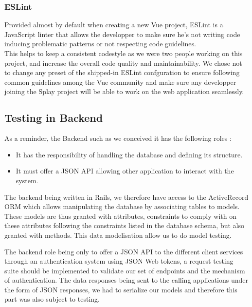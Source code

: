 \documentclass{eplmastersthesis}
\begin{document}
        \subsubsection{ESLint}

          Provided almost by default when creating a new Vue project, ESLint
          \cite{eslint} is a JavaScript linter that allows the developper to
          make sure he's not writing code inducing problematic patterns or not
          respecting code guidelines.\\
          This helps to keep a consistent codestyle as we were two people working
          on this project, and increase the overall code quality and
          maintainability. We chose not to change any preset of the shipped-in
          ESLint confguration to ensure following common guidelines among the Vue
          community and make sure any developper joining the Splay project will
          be able to work on the web application seamlessly.

      \subsection{Testing in Backend}

        As a reminder, the Backend such as we conceived it has the following
        roles :

        \begin{itemize}
          \item It has the responsibility of handling the database and
          defining its structure.
          \item It must offer a JSON API allowing other application to interact
          with the system.
        \end{itemize}

        The backend being written in Rails, we therefore have access to the
        ActiveRecord ORM which allows manipulating the database by associating
        tables to models. These models are thus granted with attributes,
        constraints to comply with on these attributes following the constraints
        listed in the database schema, but also granted with methods. This data
        modelisation allow us to do model testing.

        The backend role being only to offer a JSON API to the different client
        services through an authentication system using JSON Web tokens, a
        request testing suite should be implemented to validate our set of
        endpoints and the mechanism of authentication.
        The data responses being sent to the calling applications under the form
        of JSON responses, we had to serialize our models and therefore this
        part was also subject to testing.
\end{document}
